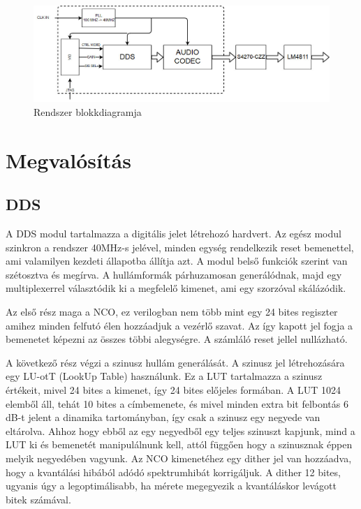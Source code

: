 \documentclass[a4paper,11pt]{article}
\begin{document}
\begin{figure}[h!]
	\begin{center}
		\includegraphics[scale=0.48]{system_block.jpg}	
	\end{center}
	\caption{Rendszer blokkdiagramja}
	\label{a:DDSsystem}
\end{figure}

\section{Megvalósítás}

\subsection{DDS}

A DDS modul tartalmazza a digitális jelet létrehozó hardvert. Az egész modul szinkron a rendszer 40MHz-s jelével, minden egység rendelkezik reset bemenettel, ami valamilyen kezdeti állapotba állítja azt. A modul belső funkciók szerint van szétosztva és megírva. A hullámformák párhuzamosan generálódnak, majd egy multiplexerrel választódik ki a megfelelő kimenet, ami egy szorzóval skálázódik.

Az első rész maga a NCO, ez verilogban nem több mint egy 24 bites regiszter amihez minden felfutó élen hozzáadjuk a vezérlő szavat. Az így kapott jel fogja a bemenetet képezni az összes többi alegységre. A számláló reset jellel nullázható.

A következő rész végzi a szinusz hullám generálását. A szinusz jel létrehozására egy LU-otT (LookUp Table) használunk. Ez a LUT tartalmazza a szinusz értékeit, mivel 24 bites a kimenet, így 24 bites előjeles formában. A LUT 1024 elemből áll, tehát 10 bites a címbemenete, és mivel minden extra bit felbontás 6 dB-t jelent a dinamika tartományban, így csak a szinusz egy negyede van eltárolva. Ahhoz hogy ebből az egy negyedből egy teljes szinuszt kapjunk, mind a LUT ki és bemenetét manipulálnunk kell, attól függően hogy a szinusznak éppen melyik negyedében vagyunk. Az NCO kimenetéhez egy dither jel van hozzáadva, hogy a kvantálási hibából adódó spektrumhibát korrigáljuk. A dither 12 bites, ugyanis úgy a legoptimálisabb, ha mérete megegyezik a kvantáláskor levágott bitek számával.
\end{document}

